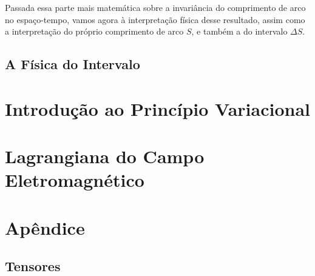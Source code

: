 \documentclass[12pt,a4paper]{article}
\begin{document}
Passada essa parte mais matemática sobre a invariância do comprimento de arco no espaço-tempo, vamos agora 
à interpretação física desse resultado, assim como a interpretação do próprio comprimento de arco $S$, e também
a do intervalo $\Delta S$.
\subsection{A Física do Intervalo}
\section{Introdução ao Princípio Variacional}

\section{Lagrangiana do Campo Eletromagnético}

\section{Apêndice}
\subsection{Tensores} 

\newpage
\printbibliography
\end{document}
